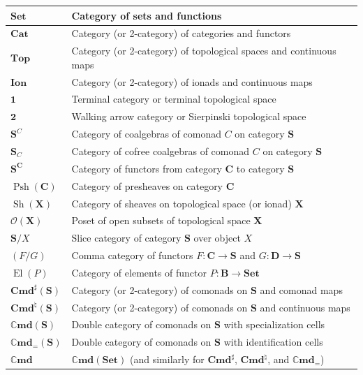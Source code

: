\documentclass[11pt, oneside, article]{memoir}
\theoremstyle{plain}
\theoremstyle{definition}
\theoremstyle{remark}
\DeclareMathOperator{\Sh}{Sh}
\DeclareMathOperator{\Psh}{Psh}
\DeclareMathOperator{\El}{El}
\newcommand{\namedcat}[1]{\mathbf{#1}}
\newcommand{\cat}[1]{\mathbf{#1}}
\newcommand{\spa}[1]{\mathbf{#1}}
\newcommand{\Set}{\namedcat{Set}}
\newcommand{\Cat}{\namedcat{Cat}}
\renewcommand{\Top}{\namedcat{Top}}
\newcommand{\Cmd}{\mathbb{C}\namedcat{md}}
\newcommand{\CmdSet}{\Cmd}
\newcommand{\CmdId}{\Cmd_=}
\newcommand{\CmdIdSet}{\CmdId}
\newcommand{\Com}{\namedcat{Cmd}^\sharp}
\newcommand{\ComSet}{\Com}
\newcommand{\Con}{\namedcat{Cmd}^\natural}
\newcommand{\ConSet}{\Con}
\newcommand{\CoalgOn}[2]{{#2}^{#1}}
\newcommand{\CoalgS}[1]{\CoalgOn{#1}{\bS}}
\newcommand{\KlOn}[2]{{#2}_{#1}}
\newcommand{\KlS}[1]{\KlOn{#1}{\bS}}
\newcommand{\point}{\mathbf{1}}
\newcommand{\arro}{\mathbf{2}}
\newcommand{\ph}[1]{#1}
\newcommand{\fun}[2]{{#2}^{#1}}
\newcommand{\Ps}[1]{\Psh(#1)}
\newcommand{\Ionad}{\namedcat{Ion}}
\newcommand{\cmnd}[1]{{#1}}
\newcommand{\xX}{X}
\newcommand{\cC}{\cmnd{C}}
\newcommand{\bB}{\cat{B}}
\newcommand{\bC}{\cat{C}}
\newcommand{\bD}{\cat{D}}
\newcommand{\bS}{\cat{S}}
\newcommand{\pP}{\ph{P}}
\newcommand{\tX}{\spa{X}}
\newcommand{\CS}{\CoalgS{\cC}}
\newcommand{\KlCS}{\KlS{\cC}}
\newcommand{\opens}[1]{\mathcal{O}(#1)}
\begin{document}
\begin{center}
  \renewcommand{\arraystretch}{1.5}%
  \begin{tabular}{|>{\centering\arraybackslash}p{5em}|>{\centering\arraybackslash}p{30em}|}
    \hline
    $\Set$ & Category of sets and functions \\
    \hline
    $\Cat$ & Category (or 2-category) of categories and functors \\
    \hline
    $\Top$ & Category (or 2-category) of topological spaces and continuous maps \\
    \hline
    $\Ionad$ & Category (or 2-category) of ionads and continuous maps \\
    \hline
    $\point$ & Terminal category or terminal topological space \\
    \hline
    $\arro$ & Walking arrow category or Sierpinski topological space \\
    \hline
    $\CS$ & Category of coalgebras of comonad $\cC$ on category $\bS$ \\
    \hline
    $\KlCS$ & Category of cofree coalgebras of comonad $\cC$ on category $\bS$ \\
    \hline
    $\fun{\bC}{\bS}$ & Category of functors from category $\bC$ to category $\bS$ \\
    \hline
    $\Ps{\bC}$ & Category of presheaves on category $\bC$ \\
    \hline
    $\Sh(\tX)$ & Category of sheaves on topological space (or ionad) $\tX$ \\
    \hline
    $\opens{\tX}$ & Poset of open subsets of topological space $\tX$ \\
    \hline
    $\bS/\xX$ & Slice category of category $\bS$ over object $\xX$ \\
    \hline
    $(F / G)$ & Comma category of functors $F\colon \bC \to \bS$ and $G \colon \bD \to \bS$ \\
    \hline
    $\El(\pP)$ & Category of elements of functor $\pP \colon \bB \to \Set$ \\
    \hline
    $\Com(\bS)$ & Category (or 2-category) of comonads on $\bS$ and comonad maps \\
    \hline
    $\Con(\bS)$ & Category (or 2-category) of comonads on $\bS$ and continuous maps \\
    \hline
    $\Cmd(\bS)$ & Double category of comonads on $\bS$ with specialization cells \\
    \hline
    $\CmdId(\bS)$ & Double category of comonads on $\bS$ with identification cells \\
    \hline
    $\CmdSet$ & $\Cmd(\Set)$ (and similarly for $\ComSet$, $\ConSet$, and $\CmdIdSet$) \\
    \hline
  \end{tabular}
\end{center}
\end{document}
